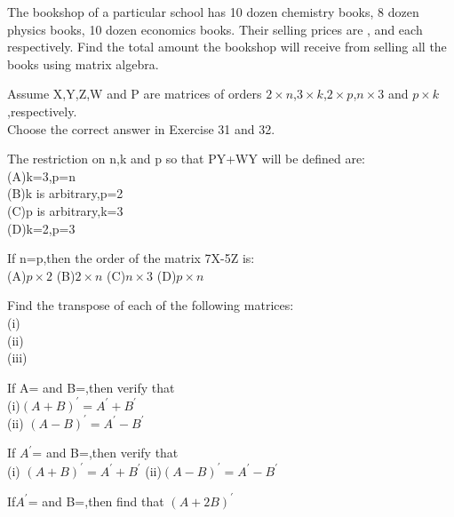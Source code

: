 \item The bookshop of a particular school has 10 dozen chemistry books, 8 dozen
physics books, 10 dozen economics books. Their selling prices are ,  and
  each respectively. Find the total amount the bookshop will receive from
selling all the books using matrix algebra.\\
\solution

Assume X,Y,Z,W and P are matrices of orders $2\times n$,$3 \times k$,$2\times p$,$n\times 3$ and $p\times k$,respectively.\\
Choose the correct answer in Exercise 31 and 32.\\
\item The restriction on n,k and p so that PY+WY will be defined are:\\
(A)k=3,p=n\\
 (B)k is arbitrary,p=2 \\
 (C)p is arbitrary,k=3 \\
 (D)k=2,p=3\\
\item If n=p,then the order of the matrix 7X-5Z is:\\
(A)$p \times 2$ (B)$2 \times n$ (C)$n \times 3$ (D)$p \times n$\\
\item Find the transpose of each of the following matrices:\\
(i)\\ (ii)\\ (iii)\\
\item If A= and B=,then verify that\\
(i)$(A+B)^{'}=A^{'}+B^{'}$ \\(ii) $(A-B)^{'}=A^{'}-B^{'}$\\
\item If $A^{'}$= and B=,then verify that\\
(i) $(A+B)^{'}=A^{'}+B^{'}$ (ii)$(A-B)^{'}=A^{'}-B^{'}$
\item If$ A^{'}$= and B=,then find that $(A+2B)^{'}$\\

